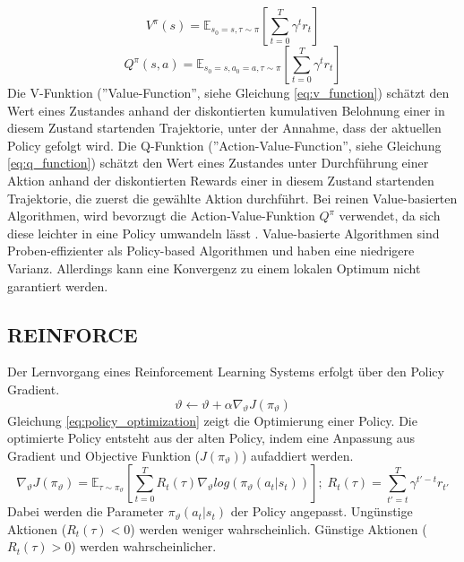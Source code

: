 \begin{equation}
    V^\pi (s)=\mathbb{E}_{s_0=s, \tau \sim \pi} \left[ \sum_{t=0}^T \gamma^t r_t \right]
    \label{eq:v_function}
\end{equation}
\begin{equation}
    Q^\pi (s,a) = \mathbb{E}_{s_0=s,a_0=a,\tau\sim\pi} \left[ \sum_{t=0}^T \gamma^t r_t\right]
    \label{eq:q_function}
\end{equation}
Die V-Funktion (''Value-Function'', siehe Gleichung \ref{eq:v_function}) schätzt den Wert eines Zustandes anhand der diskontierten kumulativen Belohnung einer in diesem Zustand startenden Trajektorie, unter der Annahme, dass der aktuellen Policy gefolgt wird. 
Die Q-Funktion (''Action-Value-Function'', siehe Gleichung \ref{eq:q_function}) schätzt den Wert eines Zustandes unter Durchführung einer Aktion anhand der diskontierten Rewards einer in diesem Zustand startenden Trajektorie, die zuerst die gewählte Aktion durchführt. 
Bei reinen Value-basierten Algorithmen, wird bevorzugt die Action-Value-Funktion $Q^\pi$ verwendet, da sich diese leichter in eine Policy umwandeln lässt \cite{FoundationsDeepRL}. 
Value-basierte Algorithmen sind Proben-effizienter als Policy-based Algorithmen und haben eine niedrigere Varianz. Allerdings kann eine Konvergenz zu einem lokalen Optimum nicht garantiert werden.

\subsection{REINFORCE}
Der Lernvorgang eines Reinforcement Learning Systems erfolgt über den Policy Gradient.
\begin{equation}
    \vartheta \leftarrow \vartheta + \alpha \nabla_\vartheta J(\pi_\vartheta)
    \label{eq:policy_optimization}
\end{equation}
Gleichung \ref{eq:policy_optimization} zeigt die Optimierung einer Policy. Die optimierte Policy entsteht aus der alten Policy, indem eine Anpassung aus Gradient und Objective Funktion ($J(\pi_\vartheta)$) aufaddiert werden.
\begin{equation}
    \nabla_\vartheta J(\pi_\vartheta) = \mathbb{E}_{\tau\sim\pi_\vartheta} \left[ \sum_{t=0}^T R_t(\tau) \nabla_\vartheta log(\pi_\vartheta(a_t\vert s_t))\right]
    ;\; R_t(\tau) = \sum_{t'=t}^T \gamma^{t'-t} r_{t'}
    \label{eq:gradient_objective_function}
\end{equation}
Dabei werden die Parameter $\pi_\vartheta(a_t\vert s_t)$ der Policy angepasst. Ungünstige Aktionen ($R_t(\tau) < 0$) werden weniger wahrscheinlich. Günstige Aktionen ($R_t(\tau) > 0$) werden wahrscheinlicher. \cite{FoundationsDeepRL}

